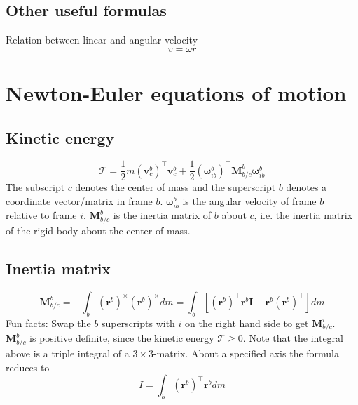 \subsection{Other useful formulas}
Relation between linear and angular velocity
\begin{equation}
    v = \omega r
\end{equation}

\section{Newton-Euler equations of motion}
\subsection{Kinetic energy}
\begin{equation}
    \mathcal{T} = \frac{1}{2} m (\mathbf{v}_c^b)^\top \mathbf{v}_c^b +  \frac{1}{2} (\boldsymbol{\omega}_{ib}^b)^\top \mathbf{M}_{b/c}^b \boldsymbol{\omega}_{ib}^b
\end{equation}
The subscript $c$ denotes the center of mass and the superscript $b$ denotes a coordinate vector/matrix in frame $b$. $\boldsymbol{\omega}_{ib}^b$ is the angular velocity of frame $b$ relative to frame $i$. $\mathbf{M}_{b/c}^b$ is the inertia matrix of $b$ about $c$, i.e. the inertia matrix of the rigid body about the center of mass.

\subsection{Inertia matrix}
\begin{equation}
    \mathbf{M}_{b/c}^b = -\int_b (\mathbf{r}^b)^\times (\mathbf{r}^b)^\times dm = \int_b \left[ (\mathbf{r}^b)^\top \mathbf{r}^b \mathbf{I} - \mathbf{r}^b (\mathbf{r}^b)^\top \right] dm
\end{equation}
Fun facts: Swap the $b$ superscripts with $i$ on the right hand side to get $\mathbf{M}_{b/c}^i$. $\mathbf{M}_{b/c}^b$ is positive definite, since the kinetic energy $\mathcal{T} \geq 0$. Note that the integral above is a triple integral of a $3 \times 3$-matrix. About a specified axis the formula reduces to
\begin{equation}
    I = \int_{b} (\mathbf{r}^b)^\top \mathbf{r}^b dm
\end{equation}

